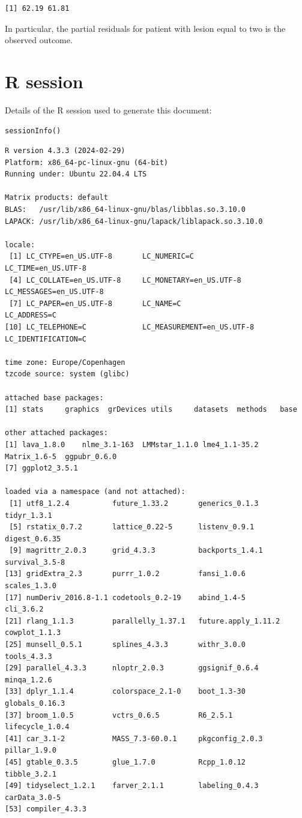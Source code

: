 \documentclass[12pt]{article}
\begin{document}
\begin{verbatim}
[1] 62.19 61.81
\end{verbatim}


In particular, the partial residuals for patient with lesion equal to
two is the observed outcome.

\clearpage

\section{R session}
\label{sec:orged20498}
Details of the R session used to generate this document:
\lstset{language=r,label= ,caption= ,captionpos=b,numbers=none}
\begin{lstlisting}
sessionInfo()
\end{lstlisting}

\begin{verbatim}
R version 4.3.3 (2024-02-29)
Platform: x86_64-pc-linux-gnu (64-bit)
Running under: Ubuntu 22.04.4 LTS

Matrix products: default
BLAS:   /usr/lib/x86_64-linux-gnu/blas/libblas.so.3.10.0 
LAPACK: /usr/lib/x86_64-linux-gnu/lapack/liblapack.so.3.10.0

locale:
 [1] LC_CTYPE=en_US.UTF-8       LC_NUMERIC=C               LC_TIME=en_US.UTF-8       
 [4] LC_COLLATE=en_US.UTF-8     LC_MONETARY=en_US.UTF-8    LC_MESSAGES=en_US.UTF-8   
 [7] LC_PAPER=en_US.UTF-8       LC_NAME=C                  LC_ADDRESS=C              
[10] LC_TELEPHONE=C             LC_MEASUREMENT=en_US.UTF-8 LC_IDENTIFICATION=C       

time zone: Europe/Copenhagen
tzcode source: system (glibc)

attached base packages:
[1] stats     graphics  grDevices utils     datasets  methods   base     

other attached packages:
[1] lava_1.8.0    nlme_3.1-163  LMMstar_1.1.0 lme4_1.1-35.2 Matrix_1.6-5  ggpubr_0.6.0 
[7] ggplot2_3.5.1

loaded via a namespace (and not attached):
 [1] utf8_1.2.4          future_1.33.2       generics_0.1.3      tidyr_1.3.1        
 [5] rstatix_0.7.2       lattice_0.22-5      listenv_0.9.1       digest_0.6.35      
 [9] magrittr_2.0.3      grid_4.3.3          backports_1.4.1     survival_3.5-8     
[13] gridExtra_2.3       purrr_1.0.2         fansi_1.0.6         scales_1.3.0       
[17] numDeriv_2016.8-1.1 codetools_0.2-19    abind_1.4-5         cli_3.6.2          
[21] rlang_1.1.3         parallelly_1.37.1   future.apply_1.11.2 cowplot_1.1.3      
[25] munsell_0.5.1       splines_4.3.3       withr_3.0.0         tools_4.3.3        
[29] parallel_4.3.3      nloptr_2.0.3        ggsignif_0.6.4      minqa_1.2.6        
[33] dplyr_1.1.4         colorspace_2.1-0    boot_1.3-30         globals_0.16.3     
[37] broom_1.0.5         vctrs_0.6.5         R6_2.5.1            lifecycle_1.0.4    
[41] car_3.1-2           MASS_7.3-60.0.1     pkgconfig_2.0.3     pillar_1.9.0       
[45] gtable_0.3.5        glue_1.7.0          Rcpp_1.0.12         tibble_3.2.1       
[49] tidyselect_1.2.1    farver_2.1.1        labeling_0.4.3      carData_3.0-5      
[53] compiler_4.3.3
\end{verbatim}

\clearpage
\end{document}
